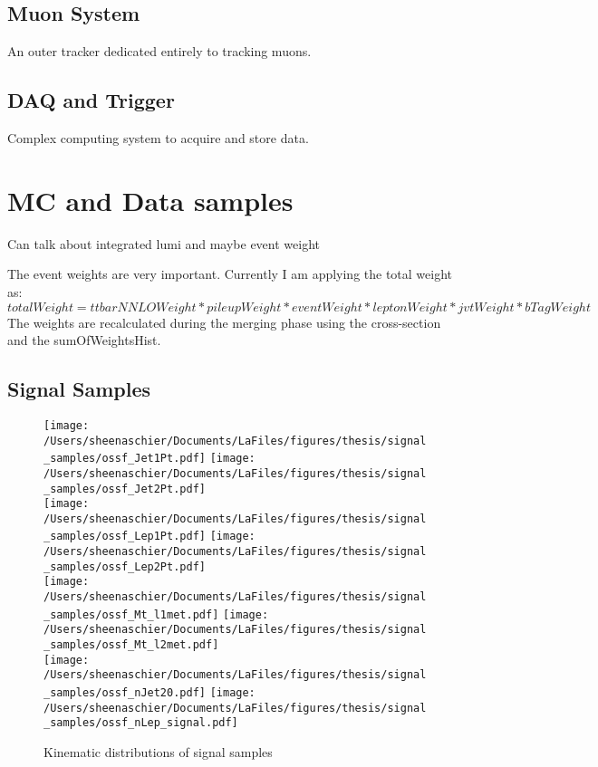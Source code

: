 \documentclass[11pt, oneside]{article}   	%
\begin{document}
\subsection{Muon System}
An outer tracker dedicated entirely to tracking muons.

\subsection{DAQ and Trigger}
Complex computing system to acquire and store data.

\clearpage

\section{MC and Data samples}
\label{sec:mcdata}
 Can talk about integrated lumi and maybe event weight


The event weights are very important.  Currently I am applying the total weight as:
\begin{equation}
\label{eq:weight}
totalWeight = ttbarNNLOWeight*pileupWeight*eventWeight*leptonWeight*jvtWeight*bTagWeight
\end{equation}
The weights are recalculated during the merging phase using the cross-section and the sumOfWeightsHist.\

\subsection{Signal Samples}

  \begin{figure}[tbp]
\texttt{[image: /Users/sheenaschier/Documents/LaFiles/figures/thesis/signal\_samples/ossf\_Jet1Pt.pdf]}
\texttt{[image: /Users/sheenaschier/Documents/LaFiles/figures/thesis/signal\_samples/ossf\_Jet2Pt.pdf]}\\
 \texttt{[image: /Users/sheenaschier/Documents/LaFiles/figures/thesis/signal\_samples/ossf\_Lep1Pt.pdf]}
 \texttt{[image: /Users/sheenaschier/Documents/LaFiles/figures/thesis/signal\_samples/ossf\_Lep2Pt.pdf]}\\
 \texttt{[image: /Users/sheenaschier/Documents/LaFiles/figures/thesis/signal\_samples/ossf\_Mt\_l1met.pdf]}
 \texttt{[image: /Users/sheenaschier/Documents/LaFiles/figures/thesis/signal\_samples/ossf\_Mt\_l2met.pdf]}\\
  \texttt{[image: /Users/sheenaschier/Documents/LaFiles/figures/thesis/signal\_samples/ossf\_nJet20.pdf]}
 \texttt{[image: /Users/sheenaschier/Documents/LaFiles/figures/thesis/signal\_samples/ossf\_nLep\_signal.pdf]}\\
   \caption{Kinematic distributions of signal samples}
   \label{fig:SigSample1}
 \end{figure}
 
\end{document}
